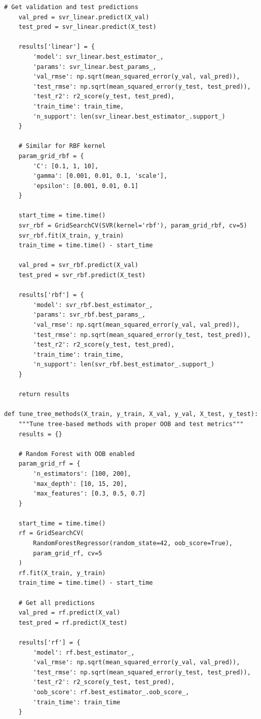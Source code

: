 \documentclass[12pt,a4paper]{article}
\theoremstyle{definition}
\begin{document}
\begin{lstlisting}[caption={Data Preparation and SVR Implementation with Proper Metrics}]
    # Get validation and test predictions
    val_pred = svr_linear.predict(X_val)
    test_pred = svr_linear.predict(X_test)
    
    results['linear'] = {
        'model': svr_linear.best_estimator_,
        'params': svr_linear.best_params_,
        'val_rmse': np.sqrt(mean_squared_error(y_val, val_pred)),
        'test_rmse': np.sqrt(mean_squared_error(y_test, test_pred)),
        'test_r2': r2_score(y_test, test_pred),
        'train_time': train_time,
        'n_support': len(svr_linear.best_estimator_.support_)
    }
    
    # Similar for RBF kernel
    param_grid_rbf = {
        'C': [0.1, 1, 10],
        'gamma': [0.001, 0.01, 0.1, 'scale'],
        'epsilon': [0.001, 0.01, 0.1]
    }
    
    start_time = time.time()
    svr_rbf = GridSearchCV(SVR(kernel='rbf'), param_grid_rbf, cv=5)
    svr_rbf.fit(X_train, y_train)
    train_time = time.time() - start_time
    
    val_pred = svr_rbf.predict(X_val)
    test_pred = svr_rbf.predict(X_test)
    
    results['rbf'] = {
        'model': svr_rbf.best_estimator_,
        'params': svr_rbf.best_params_,
        'val_rmse': np.sqrt(mean_squared_error(y_val, val_pred)),
        'test_rmse': np.sqrt(mean_squared_error(y_test, test_pred)),
        'test_r2': r2_score(y_test, test_pred),
        'train_time': train_time,
        'n_support': len(svr_rbf.best_estimator_.support_)
    }
    
    return results

def tune_tree_methods(X_train, y_train, X_val, y_val, X_test, y_test):
    """Tune tree-based methods with proper OOB and test metrics"""
    results = {}
    
    # Random Forest with OOB enabled
    param_grid_rf = {
        'n_estimators': [100, 200],
        'max_depth': [10, 15, 20],
        'max_features': [0.3, 0.5, 0.7]
    }
    
    start_time = time.time()
    rf = GridSearchCV(
        RandomForestRegressor(random_state=42, oob_score=True), 
        param_grid_rf, cv=5
    )
    rf.fit(X_train, y_train)
    train_time = time.time() - start_time
    
    # Get all predictions
    val_pred = rf.predict(X_val)
    test_pred = rf.predict(X_test)
    
    results['rf'] = {
        'model': rf.best_estimator_,
        'val_rmse': np.sqrt(mean_squared_error(y_val, val_pred)),
        'test_rmse': np.sqrt(mean_squared_error(y_test, test_pred)),
        'test_r2': r2_score(y_test, test_pred),
        'oob_score': rf.best_estimator_.oob_score_,
        'train_time': train_time
    }
    

\end{lstlisting}
\end{document}
